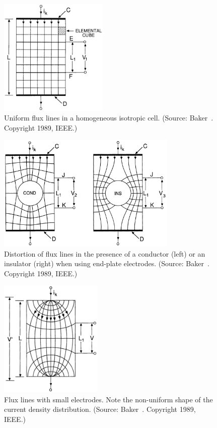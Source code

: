 \begin{figure}[p]
	\centering
	\includegraphics[height=5.6cm]{Background/end_electrodes_uniform}
	\caption[Uniform flux lines in a homogeneous isotropic cell]{Uniform flux lines
	in a homogeneous isotropic cell. (Source: Baker~\cite{baker1989}. Copyright
	\textcopyright{} 1989, IEEE.)}
	\label{fig:end_electrodes_uniform}
\end{figure}

\begin{figure}[p]
	\centering
	\includegraphics[height=5.6cm]{Background/cond_ins}
	\caption[Distortion of flux lines in the presence of a conductor
	or an insulator]{Distortion of flux lines in the presence of a conductor
	(left) or an insulator (right) when using end-plate electrodes. (Source:
	Baker~\cite{baker1989}. Copyright \textcopyright{} 1989, IEEE.)}
	\label{fig:end_electrodes_distorted}
\end{figure}

\begin{figure}[p]
	\centering
	\includegraphics[height=5.6cm]{Background/small_electrodes_flux}
	\caption[Flux lines with small electrodes]{Flux lines with small electrodes.
	Note the non-uniform shape of the current density distribution. (Source:
	Baker~\cite{baker1989}. Copyright \textcopyright{} 1989, IEEE.)}
	\label{fig:small_electrodes_flux}
\end{figure}

